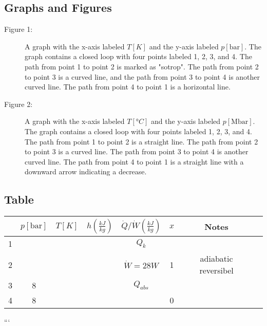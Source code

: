 \subsection*{Graphs and Figures}

\begin{description}
    \item[Figure 1:] A graph with the x-axis labeled $T[K]$ and the y-axis labeled $p[\text{bar}]$. The graph contains a closed loop with four points labeled 1, 2, 3, and 4. The path from point 1 to point 2 is marked as "sotrop". The path from point 2 to point 3 is a curved line, and the path from point 3 to point 4 is another curved line. The path from point 4 to point 1 is a horizontal line.
    
    \item[Figure 2:] A graph with the x-axis labeled $T[°C]$ and the y-axis labeled $p[\text{Mbar}]$. The graph contains a closed loop with four points labeled 1, 2, 3, and 4. The path from point 1 to point 2 is a straight line. The path from point 2 to point 3 is a curved line. The path from point 3 to point 4 is another curved line. The path from point 4 to point 1 is a straight line with a downward arrow indicating a decrease.
\end{description}

\subsection*{Table}

\begin{tabular}{|c|c|c|c|c|c|c|c|}
    \hline
    & $p[\text{bar}]$ & $T[K]$ & $h\left(\frac{kJ}{kg}\right)$ & $\dot{Q}/\dot{W}\left(\frac{kJ}{kg}\right)$ & $x$ & Notes \\
    \hline
    1 & & & & $Q_k$ & & \\
    \hline
    2 & & & & $\dot{W} = 28W$ & 1 & adiabatic reversibel \\
    \hline
    3 & 8 & & & $Q_{abs}$ & & \\
    \hline
    4 & 8 & & & & 0 & \\
    \hline
\end{tabular}

```